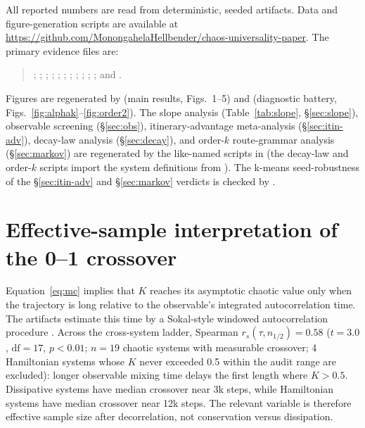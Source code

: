 \documentclass[11pt]{article}
\begin{document}
All reported numbers are read from deterministic, seeded artifacts. Data and figure-generation scripts are available at
\url{https://github.com/MonongahelaHellbender/chaos-universality-paper}. The primary evidence files are:
\begin{quote}
\small\raggedright
{};
;
;
;
;
;
;
;
;
;
; and
.
\end{quote}
Figures are regenerated by  (main results,
Figs.~1--5) and  (diagnostic battery,
Figs.~\ref{fig:alphak}--\ref{fig:order2}). The slope analysis
(Table~\ref{tab:slope}, \S\ref{sec:slope}), observable screening
(\S\ref{sec:obs}), itinerary-advantage meta-analysis (\S\ref{sec:itin-adv}),
decay-law analysis (\S\ref{sec:decay}), and order-$k$ route-grammar analysis
(\S\ref{sec:markov}) are regenerated by the like-named scripts in
 (the decay-law and order-$k$ scripts import the system
definitions from ). The k-means seed-robustness of
the \S\ref{sec:itin-adv} and \S\ref{sec:markov} verdicts is checked by
.

\appendix

\section{Effective-sample interpretation of the 0--1 crossover}

Equation~\eqref{eq:mc} implies that $K$ reaches its asymptotic chaotic value only
when the trajectory is long relative to the observable's integrated
autocorrelation time. The artifacts estimate this time by a Sokal-style windowed
autocorrelation procedure \cite{sokal1997}. Across the cross-system ladder,
Spearman $r_s(\tau,n_{1/2})=0.58$ ($t=3.0$, $\mathrm{df}=17$, $p<0.01$; $n=19$
chaotic systems with measurable crossover; 4 Hamiltonian systems whose $K$ never
exceeded 0.5 within the audit range are excluded):
longer observable mixing time delays the first length where $K>0.5$.
Dissipative systems have median crossover near 3k steps,
while Hamiltonian systems have median crossover near 12k steps. The relevant
variable is therefore effective sample size after decorrelation, not conservation
versus dissipation.
\end{document}

